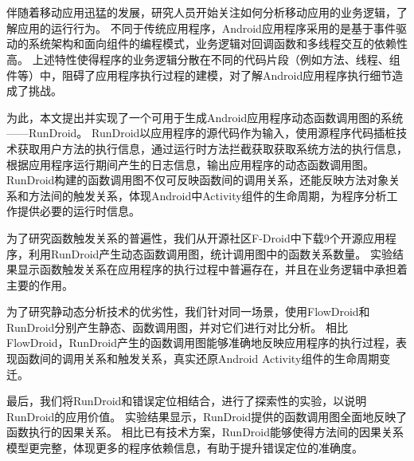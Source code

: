 
\chapter*{}


\setlength{\baselineskip}{25pt}	



伴随着移动应用迅猛的发展，研究人员开始关注如何分析移动应用的业务逻辑，了解应用的运行行为。
不同于传统应用程序，Android应用程序采用的是基于事件驱动的系统架构和面向组件的编程模式，业务逻辑对回调函数和多线程交互的依赖性高。
上述特性使得程序的业务逻辑分散在不同的代码片段（例如方法、线程、组件等）中，阻碍了应用程序执行过程的建模，对了解Android应用程序执行细节造成了挑战。



为此，本文提出并实现了一个可用于生成Android应用程序动态函数调用图的系统——RunDroid。
RunDroid以应用程序的源代码作为输入，使用源程序代码插桩技术获取用户方法的执行信息，通过运行时方法拦截获取获取系统方法的执行信息，根据应用程序运行期间产生的日志信息，输出应用程序的动态函数调用图。
RunDroid构建的函数调用图不仅可反映函数间的调用关系，还能反映方法对象关系和方法间的触发关系，体现Android中Activity组件的生命周期，为程序分析工作提供必要的运行时信息。




为了研究函数触发关系的普遍性，我们从开源社区F-Droid中下载9个开源应用程序，利用RunDroid产生动态函数调用图，统计调用图中的函数关系数量。
实验结果显示函数触发关系在应用程序的执行过程中普遍存在，并且在业务逻辑中承担着主要的作用。

为了研究静动态分析技术的优劣性，我们针对同一场景，使用FlowDroid和RunDroid分别产生静态、函数调用图，并对它们进行对比分析。
相比FlowDroid，RunDroid产生的函数调用图能够准确地反映应用程序的执行过程，表现函数间的调用关系和触发关系，真实还原Android Activity组件的生命周期变迁。

最后，我们将RunDroid和错误定位相结合，进行了探索性的实验，以说明RunDroid的应用价值。
实验结果显示，RunDroid提供的函数调用图全面地反映了函数执行的因果关系。
相比已有技术方案，RunDroid能够使得方法间的因果关系模型更完整，体现更多的程序依赖信息，有助于提升错误定位的准确度。


{}   %

